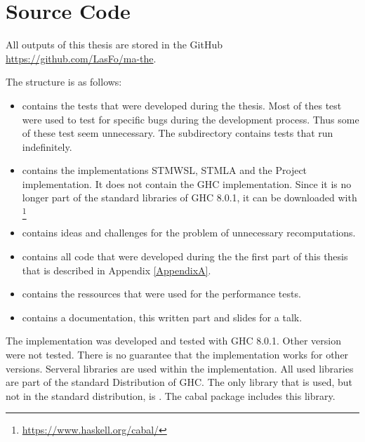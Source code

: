 
\chapter{Source Code} 
\label{AppendixC} 

All outputs of this thesis are stored in the GitHub \url{https://github.com/LasFo/ma-the}.

The structure is as follows:
\begin{itemize}
 \item {} contains the tests that were developed during the thesis. Most of thes test were
                    used to test for specific bugs during the development process. Thus some of these
                    test seem unnecessary. The subdirectory contains
                    tests that run indefinitely. 
 \item {} contains the implementations STMWSL, STMLA and the Project implementation.
                             It does not contain the GHC implementation. Since it is no longer part of 
                             the standard libraries of GHC 8.0.1, it can be downloaded with \footnote{\url{https://www.haskell.org/cabal/}}
 \item {} contains ideas and challenges for the problem of unnecessary recomputations.
 \item {} contains all code that were developed during the the first part of this thesis that is described in Appendix \ref{AppendixA}.
 \item {} contains the ressources that were used for the performance tests.
 \item {} contains a documentation, this written part and slides for a talk.
\end{itemize}

The implementation was developed and tested with GHC 8.0.1. Other version were not tested. There 
is no guarantee that the implementation works for other versions. Serveral libraries are used 
within the implementation. All used libraries are part of the standard Distribution of GHC. 
The only library that is used, but not in the standard distribution, is . 
The cabal package  includes this library. 